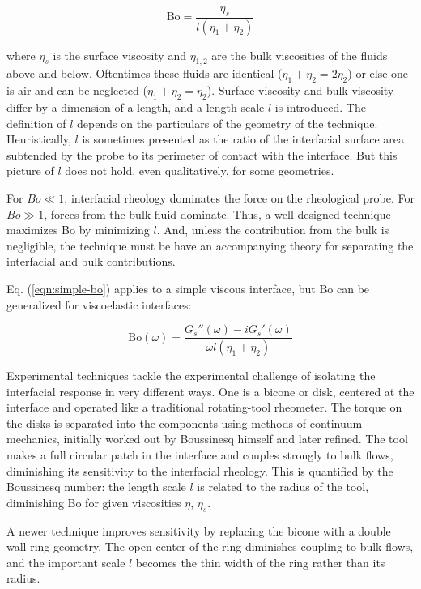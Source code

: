 \begin{equation}
  \label{eqn:simple-bo}
  \text{Bo} = \frac{\eta_s}{l(\eta_1 + \eta_2)}
\end{equation}

\noindent where $\eta_s$ is the surface viscosity and $\eta_{1,2}$ are the bulk viscosities of the fluids above and below. Oftentimes these fluids are identical ($\eta_1 + \eta_2 = 2\eta_2$) or else one is air and can be neglected ($\eta_1 + \eta_2 = \eta_2$). Surface viscosity and bulk viscosity differ by a dimension of a length, and a length scale $l$ is introduced. The definition of $l$ depends on the particulars of the geometry of the technique. Heuristically, $l$ is sometimes presented as the ratio of the interfacial surface area subtended by the probe to its perimeter of contact with the interface. But this picture of $l$ does not hold, even qualitatively, for some geometries\cite{Levine2004}.

For $Bo \ll 1$, interfacial rheology dominates the force on the rheological probe. For $Bo \gg 1$, forces from the bulk fluid dominate. Thus, a well designed technique maximizes Bo by minimizing $l$. And, unless the contribution from the bulk is negligible, the technique must be have an accompanying theory for separating the interfacial and bulk contributions.


Eq. (\ref{eqn:simple-bo}) applies to a simple viscous interface, but Bo can be generalized for viscoelastic interfaces\cite{Fuller2012}:

\begin{equation}
  \text{Bo}(\omega) = \frac{G_s''(\omega) - i G_s'(\omega)}{\omega l(\eta_1 + \eta_2)}
\end{equation}


Experimental techniques tackle the experimental challenge of isolating the interfacial response in very different ways. One is a bicone or disk, centered at the interface and operated like a traditional rotating-tool rheometer. The torque on the disks is separated into the components using methods of continuum mechanics\cite{Derkach2009}, initially worked out by Boussinesq himself\cite{Boussinesq1913} and later refined\cite{Oh1978}. The tool makes a full circular patch in the interface and couples strongly to bulk flows, diminishing its sensitivity to the interfacial rheology. This is quantified by the Boussinesq number: the length scale $l$ is related to the radius of the tool, diminishing Bo for given viscosities $\eta$, $\eta_s$.

A newer technique improves sensitivity by replacing the bicone with a double wall-ring geometry\cite{Vandebril2010}. The open center of the ring diminishes coupling to bulk flows, and the important scale $l$ becomes the thin width of the ring rather than its radius.

